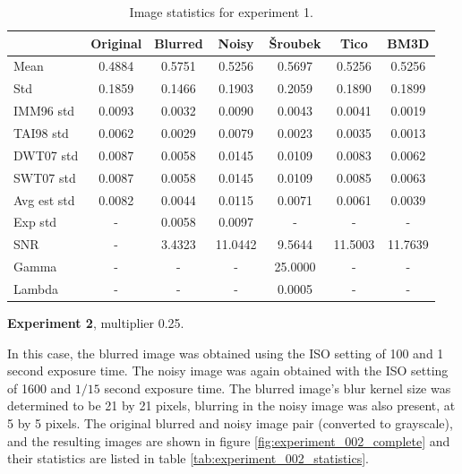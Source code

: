 \documentclass[12pt,notitlepage]{report}
\begin{document}
\begin{table}[htb]
  \centering
  \begin{tabular}{ | l | c | c | c | c | c | c | }
    \hline
		        & Original & Blurred & Noisy   & Šroubek & Tico    & BM3D    \\ \hline
	Mean        & 0.4884   & 0.5751  & 0.5256  & 0.5697  & 0.5256  & 0.5256  \\ \hline
	Std         & 0.1859   & 0.1466  & 0.1903  & 0.2059  & 0.1890  & 0.1899  \\ \hline
	IMM96 std   & 0.0093   & 0.0032  & 0.0090  & 0.0043  & 0.0041  & 0.0019  \\ \hline
	TAI98 std   & 0.0062   & 0.0029  & 0.0079  & 0.0023  & 0.0035  & 0.0013  \\ \hline
	DWT07 std   & 0.0087   & 0.0058  & 0.0145  & 0.0109  & 0.0083  & 0.0062  \\ \hline
	SWT07 std   & 0.0087   & 0.0058  & 0.0145  & 0.0109  & 0.0085  & 0.0063  \\ \hline
	Avg est std & 0.0082   & 0.0044  & 0.0115  & 0.0071  & 0.0061  & 0.0039  \\ \hline
	Exp std     & -        & 0.0058  & 0.0097  & -       & -       & -       \\ \hline
	SNR         & -        & 3.4323  & 11.0442 & 9.5644  & 11.5003 & 11.7639 \\ \hline
	Gamma       & -        & -       & -       & 25.0000 & -       & -       \\ \hline
	Lambda      & -        & -       & -       & 0.0005  & -       & -       \\ \hline

  \end{tabular}
  \caption{Image statistics for experiment 1.}
  \label{tab:experiment_001_statistics}
\end{table}

\noindent \textbf{Experiment 2}, multiplier 0.25.

In this case, the blurred image was obtained using the ISO setting of 100 and 1 second exposure time. The noisy image was again obtained with the ISO setting of 1600 and $1/15$ second exposure time. The blurred image's blur kernel size was determined to be 21 by 21 pixels, blurring in the noisy image was also present, at 5 by 5 pixels. The original blurred and noisy image pair (converted to grayscale), and the resulting images are shown in figure \ref{fig:experiment_002_complete} and their statistics are listed in table \ref{tab:experiment_002_statistics}.
\end{document}
